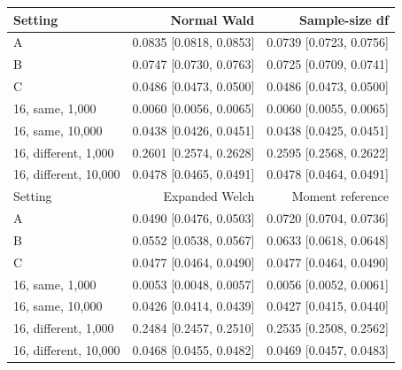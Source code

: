 \begin{tabular}{@{}lrr@{}}
\toprule
Setting & Normal Wald & Sample-size df\\
\midrule
A & 0.0835 [0.0818, 0.0853] & 0.0739 [0.0723, 0.0756]\\
B & 0.0747 [0.0730, 0.0763] & 0.0725 [0.0709, 0.0741]\\
C & 0.0486 [0.0473, 0.0500] & 0.0486 [0.0473, 0.0500]\\
16, same, 1,000 & 0.0060 [0.0056, 0.0065] & 0.0060 [0.0055, 0.0065]\\
16, same, 10,000 & 0.0438 [0.0426, 0.0451] & 0.0438 [0.0425, 0.0451]\\
16, different, 1,000 & 0.2601 [0.2574, 0.2628] & 0.2595 [0.2568, 0.2622]\\
16, different, 10,000 & 0.0478 [0.0465, 0.0491] & 0.0478 [0.0464, 0.0491]\\
\addlinespace[5pt]
\midrule
Setting & Expanded Welch & Moment reference\\
\midrule
A & 0.0490 [0.0476, 0.0503] & 0.0720 [0.0704, 0.0736]\\
B & 0.0552 [0.0538, 0.0567] & 0.0633 [0.0618, 0.0648]\\
C & 0.0477 [0.0464, 0.0490] & 0.0477 [0.0464, 0.0490]\\
16, same, 1,000 & 0.0053 [0.0048, 0.0057] & 0.0056 [0.0052, 0.0061]\\
16, same, 10,000 & 0.0426 [0.0414, 0.0439] & 0.0427 [0.0415, 0.0440]\\
16, different, 1,000 & 0.2484 [0.2457, 0.2510] & 0.2535 [0.2508, 0.2562]\\
16, different, 10,000 & 0.0468 [0.0455, 0.0482] & 0.0469 [0.0457, 0.0483]\\
\bottomrule
\end{tabular}
